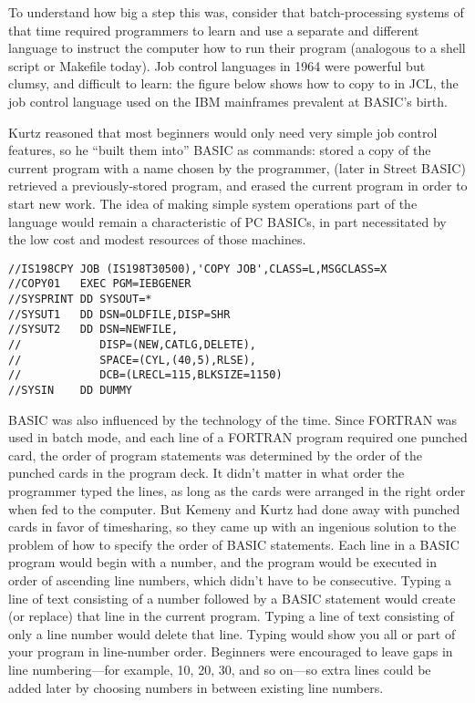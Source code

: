 To understand how big a step this was, consider that batch-processing
systems of that time required programmers to learn and use a separate
and different  language to instruct the computer how to
run their program (analogous to a shell script or Makefile today).
Job control languages in 1964 were powerful but clumsy, and difficult to
learn: the figure below shows how to copy  to  in
JCL, the job control language used on the IBM mainframes prevalent at
BASIC's birth.

Kurtz reasoned that most beginners would only need very simple job
control features, so he ``built them into'' BASIC as commands: 
stored a copy of the current program with a name chosen by the
programmer,  (later  in Street BASIC) retrieved a
previously-stored program, and  erased the current program in
order to start new work.
The idea of making simple system operations part of the language would
remain a characteristic of PC BASICs, in part necessitated by the low
cost and modest resources of those machines.


\begin{verbatim}
//IS198CPY JOB (IS198T30500),'COPY JOB',CLASS=L,MSGCLASS=X
//COPY01   EXEC PGM=IEBGENER
//SYSPRINT DD SYSOUT=*
//SYSUT1   DD DSN=OLDFILE,DISP=SHR
//SYSUT2   DD DSN=NEWFILE,
//            DISP=(NEW,CATLG,DELETE),
//            SPACE=(CYL,(40,5),RLSE),
//            DCB=(LRECL=115,BLKSIZE=1150)
//SYSIN    DD DUMMY
\end{verbatim}



BASIC was also influenced by the technology of the time.  
Since FORTRAN was used in batch mode, and each line of a FORTRAN program
required one punched card, the order of program statements was
determined by the order of the punched cards in the program deck.  It
didn't matter in what order the programmer typed the lines, as long as
the cards were arranged in the right order when fed to the computer.
But 
Kemeny and Kurtz had done away with punched cards in favor of
timesharing, so they
came up with an ingenious solution to the problem of
how to specify the order of BASIC statements.  Each line in a BASIC
program would begin with a number, and the program would be
executed in order of ascending line numbers, which didn't have to be
consecutive.  
Typing a line of text consisting of a number followed by a BASIC statement
would create (or replace) that line in the current program.
Typing a line of text consisting of only a line number would delete that line.
Typing  would show
you all or part of your program in line-number order.
Beginners were encouraged to leave gaps in line
numbering---for example, 10, 20, 30, and so on---so 
extra lines could be added later by choosing numbers in between
existing line numbers.

